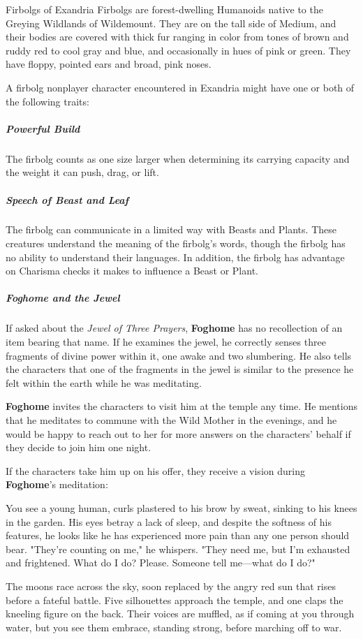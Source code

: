\documentclass[10pt,a4paper,twoside,fancy,bg=print,twocolumn,openany,nodeprecatedcode]{dndbook}
\begin{document}
\begin{DndSidebar}[float=!b]{Firbolgs of Exandria}
Firbolgs are forest-dwelling Humanoids native to the Greying Wildlands of Wildemount. They are on the tall side of Medium, and their bodies are covered with thick fur ranging in color from tones of brown and ruddy red to cool gray and blue, and occasionally in hues of pink or green. They have floppy, pointed ears and broad, pink noses.



A firbolg nonplayer character encountered in Exandria might have one or both of the following traits:



\subparagraph{Powerful Build}
The firbolg counts as one size larger when determining its carrying capacity and the weight it can push, drag, or lift.



\subparagraph{Speech of Beast and Leaf}
The firbolg can communicate in a limited way with Beasts and Plants. These creatures understand the meaning of the firbolg's words, though the firbolg has no ability to understand their languages. In addition, the firbolg has advantage on Charisma checks it makes to influence a Beast or Plant.



\end{DndSidebar}

\subparagraph{Foghome and the Jewel}
If asked about the \textit{Jewel of Three Prayers}, \textbf{Foghome} has no recollection of an item bearing that name. If he examines the jewel, he correctly senses three fragments of divine power within it, one awake and two slumbering. He also tells the characters that one of the fragments in the jewel is similar to the presence he felt within the earth while he was meditating.

\textbf{Foghome} invites the characters to visit him at the temple any time. He mentions that he meditates to commune with the Wild Mother in the evenings, and he would be happy to reach out to her for more answers on the characters' behalf if they decide to join him one night.

If the characters take him up on his offer, they receive a vision during \textbf{Foghome}'s meditation:

\begin{DndReadAloud}{}
You see a young human, curls plastered to his brow by sweat, sinking to his knees in the garden. His eyes betray a lack of sleep, and despite the softness of his features, he looks like he has experienced more pain than any one person should bear. "They're counting on me," he whispers. "They need me, but I'm exhausted and frightened. What do I do? Please. Someone tell me—what do I do?"

The moons race across the sky, soon replaced by the angry red sun that rises before a fateful battle. Five silhouettes approach the temple, and one claps the kneeling figure on the back. Their voices are muffled, as if coming at you through water, but you see them embrace, standing strong, before marching off to war.

\end{DndReadAloud}
\end{document}
